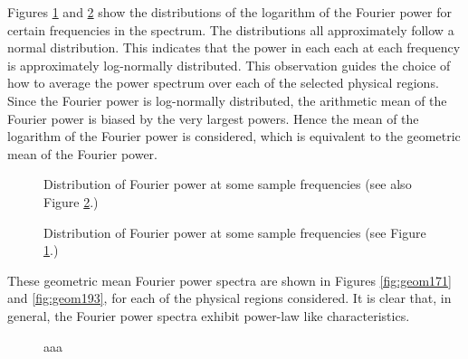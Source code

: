 \documentclass[preprint]{../aastex52/aastex}
\begin{document}
Figures \ref{fig:dist171} and \ref{fig:dist193} show the distributions
of the logarithm of the Fourier power for certain frequencies in the
spectrum.  The distributions all approximately follow a normal
distribution.  This indicates that the power in each each at each
frequency is approximately log-normally distributed.  This observation
guides the choice of how to average the power spectrum over each of
the selected physical regions.  Since the Fourier power is
log-normally distributed, the arithmetic mean of the Fourier power is
biased by the very largest powers.  Hence the mean of the logarithm of
the Fourier power is considered, which is equivalent to the geometric
mean of the Fourier power.

\begin{figure}
\label{fig:dist171}
\caption{Distribution of Fourier power at some sample frequencies (see also Figure \ref{fig:dist193}.)}
\end{figure}

\begin{figure}
\label{fig:dist193}
\caption{Distribution of Fourier power at some sample frequencies (see Figure \ref{fig:dist171}.)}
\end{figure}

These geometric mean Fourier power spectra are shown in Figures
\ref{fig:geom171} and \ref{fig:geom193}, for each of the physical
regions considered.  It is clear that, in general, the Fourier power
spectra exhibit power-law like characteristics.

\begin{figure}
\label{fig:fit171}
\caption{aaa}
\end{figure}
\end{document}
